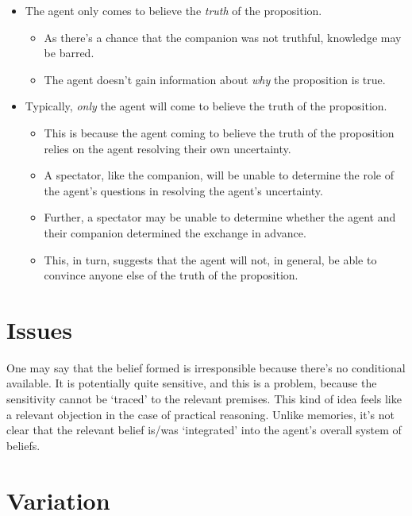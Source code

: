 \documentclass[10pt]{article}
\begin{document}
\begin{itemize}
\item The agent only comes to believe the \emph{truth} of the proposition.
  \begin{itemize}
  \item As there's a chance that the companion was not truthful, knowledge may be barred.
  \item The agent doesn't gain information about \emph{why} the proposition is true.
  \end{itemize}
\item Typically, \emph{only} the agent will come to believe the truth of the proposition.
  \begin{itemize}
  \item This is because the agent coming to believe the truth of the proposition relies on the agent resolving their own uncertainty.
  \item A spectator, like the companion, will be unable to determine the role of the agent's questions in resolving the agent's uncertainty.
  \item Further, a spectator may be unable to determine whether the agent and their companion determined the exchange in advance.
  \item This, in turn, suggests that the agent will not, in general, be able to convince anyone else of the truth of the proposition.
  \end{itemize}
\end{itemize}


\section{Issues}
\label{sec:issues}

One may say that the belief formed is irresponsible because there's no conditional available.
It is potentially quite sensitive, and this is a problem, because the sensitivity cannot be `traced' to the relevant premises.
This kind of idea feels like a relevant objection in the case of practical reasoning.
Unlike memories, it's not clear that the relevant belief is/was `integrated' into the agent's overall system of beliefs.




\newpage



\section{Variation}
\label{sec:variation}
\end{document}
